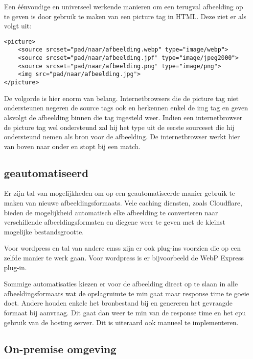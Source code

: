 Een éénvoudige en universeel werkende manieren om een terugval afbeelding op te geven is door gebruik te maken van een picture tag in HTML. Deze ziet er als volgt uit:

\begin{lstlisting}
<picture>
	<source srcset="pad/naar/afbeelding.webp" type="image/webp">
	<source srcset="pad/naar/afbeelding.jpf" type="image/jpeg2000">
	<source srcset="pad/naar/afbeelding.png" type="image/png"> 
	<img src="pad/naar/afbeelding.jpg">
</picture>
\end{lstlisting}

De volgorde is hier enorm van belang. Internetbrowsers die de picture tag niet ondersteunen negeren de source tags ook en herkennen enkel de img tag en geven alsvolgt de afbeelding binnen die tag ingesteld weer. Indien een internetbrowser de picture tag wel ondersteund zal hij het type uit de eerste sourceset die hij ondersteund nemen als bron voor de afbeelding. De internetbrowser werkt hier van boven naar onder en stopt bij een match.

\subsection{geautomatiseerd}
\label{sec:afbeeldingscompressie-implementatie-web-automated}

Er zijn tal van mogelijkheden om op een geautomatiseerde manier gebruik te maken van nieuwe \glspl{afbeeldingsformaat}. Vele caching diensten, zoals Cloudflare, bieden de mogelijkheid automatisch elke afbeelding te converteren naar verschillende afbeeldingsformaten en diegene weer te geven met de kleinst mogelijke bestandsgrootte. 

Voor \gls{wordpress} en tal van andere \glspl{cms} zijn er ook \glspl{plug-in} voorzien die op een zelfde manier te werk gaan. Voor \gls{wordpress} is er bijvoorbeeld de WebP Express  \gls{plug-in}.

Sommige automatisaties kiezen er voor de afbeelding direct op te slaan in alle \glspl{afbeeldingsformaat} wat de opslagruimte te min gaat maar response time te goeie doet. Andere houden enkele het bronbestand bij en genereren het gevraagde formaat bij aanvraag. Dit gaat dan weer te min van de response time en het cpu gebruik van de \gls{hosting} server. Dit is uiteraard ook manueel te implementeren.

\subsection{On-premise omgeving}
\label{sec:afbeeldingscompressie-implementatie-on-premise}

